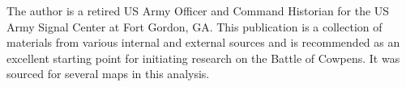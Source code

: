 The author is a retired US Army Officer and Command Historian for the US Army
Signal Center at Fort Gordon, GA.  This publication is a collection of
materials from various internal and external sources and is recommended as an
excellent starting point for initiating research on the Battle of Cowpens. It
was sourced for several maps in this analysis.
